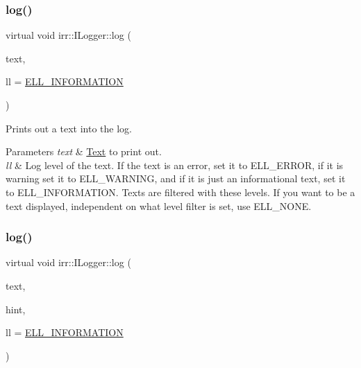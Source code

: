 \subsubsection{\texorpdfstring{log()}{log()}\hspace{0.1cm}{\footnotesize\ttfamily [1/4]}}
{\footnotesize\ttfamily virtual void irr\+::\+I\+Logger\+::log (\begin{DoxyParamCaption}\item[{const \hyperlink{namespaceirr_a9395eaea339bcb546b319e9c96bf7410}{c8} $\ast$}]{text,  }\item[{\hyperlink{namespaceirr_aa2d1cac68606a25ed24cfffccfa30a92}{E\+L\+O\+G\+\_\+\+L\+E\+V\+EL}}]{ll = {\ttfamily \hyperlink{namespaceirr_aa2d1cac68606a25ed24cfffccfa30a92a9d74de15737e326a91aec6f38c23f9cf}{E\+L\+L\+\_\+\+I\+N\+F\+O\+R\+M\+A\+T\+I\+ON}} }\end{DoxyParamCaption})\hspace{0.3cm}{\ttfamily [pure virtual]}}



Prints out a text into the log. 


\begin{DoxyParams}{Parameters}
{\em text} & \hyperlink{classText}{Text} to print out. \\
\hline
{\em ll} & Log level of the text. If the text is an error, set it to E\+L\+L\+\_\+\+E\+R\+R\+OR, if it is warning set it to E\+L\+L\+\_\+\+W\+A\+R\+N\+I\+NG, and if it is just an informational text, set it to E\+L\+L\+\_\+\+I\+N\+F\+O\+R\+M\+A\+T\+I\+ON. Texts are filtered with these levels. If you want to be a text displayed, independent on what level filter is set, use E\+L\+L\+\_\+\+N\+O\+NE. \\
\hline
\end{DoxyParams}
\mbox{\label{classirr_1_1ILogger_afccb7b2bb0a9b0415204d63e2b0cf290}} 
\subsubsection{\texorpdfstring{log()}{log()}\hspace{0.1cm}{\footnotesize\ttfamily [2/4]}}
{\footnotesize\ttfamily virtual void irr\+::\+I\+Logger\+::log (\begin{DoxyParamCaption}\item[{const \hyperlink{namespaceirr_a9395eaea339bcb546b319e9c96bf7410}{c8} $\ast$}]{text,  }\item[{const \hyperlink{namespaceirr_a9395eaea339bcb546b319e9c96bf7410}{c8} $\ast$}]{hint,  }\item[{\hyperlink{namespaceirr_aa2d1cac68606a25ed24cfffccfa30a92}{E\+L\+O\+G\+\_\+\+L\+E\+V\+EL}}]{ll = {\ttfamily \hyperlink{namespaceirr_aa2d1cac68606a25ed24cfffccfa30a92a9d74de15737e326a91aec6f38c23f9cf}{E\+L\+L\+\_\+\+I\+N\+F\+O\+R\+M\+A\+T\+I\+ON}} }\end{DoxyParamCaption})\hspace{0.3cm}{\ttfamily [pure virtual]}}



